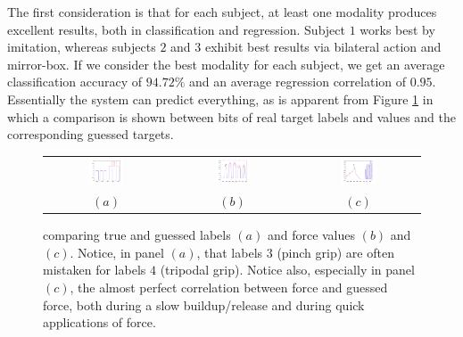 The first consideration is that for each subject, at least one
modality produces excellent results, both in classification and
regression. Subject $1$ works best by imitation, whereas subjects $2$
and $3$ exhibit best results via bilateral action and mirror-box. If
we consider the best modality for each subject, we get an average
classification accuracy of $94.72\%$ and an average regression
correlation of $0.95$. Essentially the system can predict everything,
as is apparent from Figure \ref{fig:examples} in which a comparison is
shown between bits of real target labels and values and the
corresponding guessed targets.

\begin{figure}[!ht] \centering
  \begin{tabular}{ccc}
    \includegraphics[width=0.3\textwidth]{figs/example1} &
    \includegraphics[width=0.3\textwidth]{figs/example2} &
    \includegraphics[width=0.3\textwidth]{figs/example3} \\
    $(a)$ & $(b)$ & $(c)$ \\
  \end{tabular}
  \caption{comparing true and guessed labels $(a)$ and force values
    $(b)$ and $(c)$. Notice, in panel $(a)$, that labels
    $3$ (pinch grip) are often mistaken for labels $4$ (tripodal
    grip). Notice also, especially in panel $(c)$, the almost perfect
    correlation between force and guessed force, both during a slow
    buildup/release and during quick applications of force.}
  \label{fig:examples}
\end{figure}

